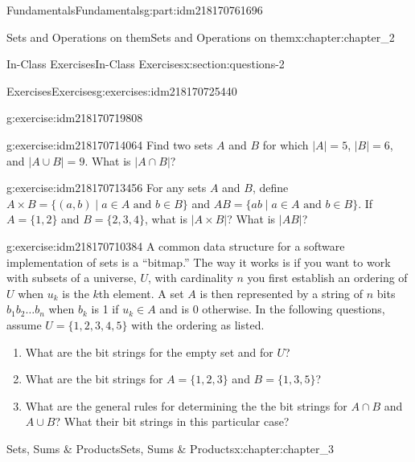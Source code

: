 \documentclass[oneside,10pt,]{book}
\numberwithin{equation}{section}
\begin{document}
\begin{partptx}{Fundamentals}{}{Fundamentals}{}{}{g:part:idm218170761696}
\begin{chapterptx}{Sets and Operations on them}{}{Sets and Operations on them}{}{}{x:chapter:chapter_2}
\begin{sectionptx}{In-Class Exercises}{}{In-Class Exercises}{}{}{x:section:questions-2}
\begin{exercises-subsection-numberless}{Exercises}{}{Exercises}{}{}{g:exercises:idm218170725440}
\begin{exercisegroup}
\begin{divisionexerciseeg}{3}{}{}{g:exercise:idm218170719808}
\begin{enumerate}[label=(\alph*)]
\end{enumerate}
%
\end{divisionexerciseeg}%
\begin{divisionexerciseeg}{4}{}{}{g:exercise:idm218170714064}%
Find two sets \(A\) and \(B\) for which \(|A| = 5\), \(|B| = 6\), and \(|A\cup B| = 9\). What is \(|A \cap B|\)?%
\end{divisionexerciseeg}%
\begin{divisionexerciseeg}{5}{}{}{g:exercise:idm218170713456}%
For any sets \(A\) and \(B\), define \(A\times B = \{(a,b) \mid a\in A \text{ and } b \in B\}\) and \(AB = \{ab \mid a\in A \text{ and } b \in B\}\). If \(A = \{1,2\}\) and \(B = \{2,3,4\}\),  what is \(|A \times B|\)? What is \(|AB|\)?%
\end{divisionexerciseeg}%
\begin{divisionexerciseeg}{6}{}{}{g:exercise:idm218170710384}%
A common data structure for a software implementation of sets is a ``bitmap.''  The way it works is if you want to work with subsets of a universe, \(U\), with cardinality \(n\) you first establish an ordering of \(U\) when \(u_k\) is the \(k\)th element.  A set \(A\) is then represented by a string of \(n\) bits  \(b_1b_2\dots b_n\) when \(b_k\) is 1 if \(u_k \in A\) and is 0 otherwise. In the following questions, assume \(U=\{1,2,3,4,5\}\) with the ordering as listed.%
\begin{enumerate}[label=(\alph*)]
\item{}What are the bit strings for the empty set and for \(U\)?%
\item{}What are the bit strings for \(A=\{1,2,3\}\) and \(B=\{1,3,5\}\)?%
\item{}What are the general rules for determining the the bit strings for \(A\cap B\) and \(A \cup B\)?  What their bit strings in this particular case?%
\end{enumerate}
%
\end{divisionexerciseeg}%
\end{exercisegroup}
\par\medskip\noindent
\end{exercises-subsection-numberless}
\end{sectionptx}
\end{chapterptx}
%
\typeout{************************************************}
\typeout{************************************************}
%
\begin{chapterptx}{Sets, Sums \& Products}{}{Sets, Sums \& Products}{}{}{x:chapter:chapter_3}

\end{chapterptx}
\end{partptx}
\end{document}
